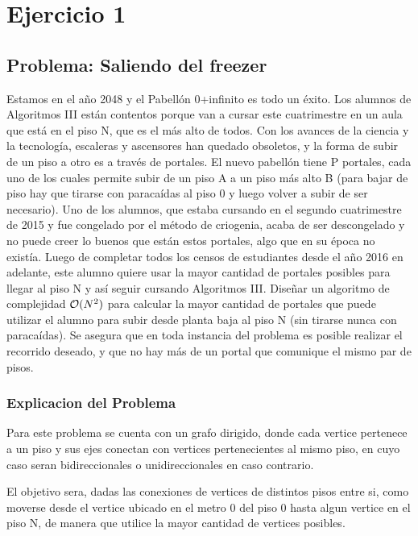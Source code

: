 \section{Ejercicio 1}
\subsection{Problema: Saliendo del freezer}

Estamos en el a\~no 2048 y el Pabell\'on 0+infinito es todo un \'exito. Los alumnos de Algoritmos III est\'an
contentos porque van a cursar este cuatrimestre en un aula que est\'a en el piso N, que es el m\'as alto de
todos. Con los avances de la ciencia y la tecnolog\'ia, escaleras y ascensores han quedado obsoletos, y la
forma de subir de un piso a otro es a trav\'es de portales. El nuevo pabell\'on tiene P portales, cada uno
de los cuales permite subir de un piso A a un piso m\'as alto B (para bajar de piso hay que tirarse con
paraca\'idas al piso 0 y luego volver a subir de ser necesario). Uno de los alumnos, que estaba cursando en
el segundo cuatrimestre de 2015 y fue congelado por el m\'etodo de criogenia, acaba de ser descongelado
y no puede creer lo buenos que est\'an estos portales, algo que en su \'epoca no exist\'ia. Luego de completar
todos los censos de estudiantes desde el a\~no 2016 en adelante, este alumno quiere usar la mayor cantidad
de portales posibles para llegar al piso N y as\'i seguir cursando Algoritmos III. Dise\~nar un algoritmo de complejidad $\mathcal{O}(N^2)$ para calcular la mayor cantidad de portales que puede utilizar el alumno para subir desde planta baja al piso N (sin tirarse nunca con paraca\'idas). Se asegura que en toda instancia del problema es posible realizar el recorrido deseado, y que no hay m\'as de un portal que comunique el mismo
par de pisos. 



\subsubsection{Explicacion del Problema}
Para este problema se cuenta con un grafo dirigido, donde cada vertice pertenece a un piso y sus ejes conectan con vertices pertenecientes al mismo piso, en cuyo caso seran bidireccionales o unidireccionales en caso contrario.


El objetivo sera, dadas las conexiones de vertices de distintos pisos entre si, como moverse desde el vertice ubicado en el metro 0 del piso 0 hasta algun vertice en el piso N, de manera que utilice la mayor cantidad de vertices posibles. 

